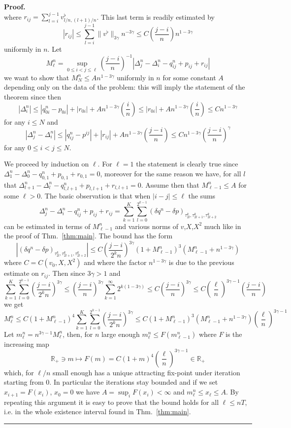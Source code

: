 \documentclass[a4paper,12pt,reqno]{article}
\newcommand{\der}{\delta}
\newcommand{\RR}{\mathbb{R}}
\newenvironment{proof}[1][Proof]{\textbf{#1.} }{\ \rule{0.5em}{0.5em}}
\begin{document}
\begin{proof}
\begin{equation*}
\end{equation*}
where
$
r_{ij}=  \sum_{l=i}^{j-1} v^\flat_{l/n,(l+1)/n}
$.
This last term is readily estimated by
$$
|r_{ij}| \le \sum_{l=i}^{j-1} \|v^\flat\|_{3\gamma} n^{-3\gamma}
 \le C \left(\frac{j-i}{ n}\right) n^{1-3\gamma}
$$
uniformly in $n$.
Let 
$$
M^n_\ell = \sup_{0\le i < j \le \ell} \left(\frac{j-i}{ n}\right)^{-1} |\Delta^n_{j}-\Delta^n_{i} -  q^n_{ij}+p_{ij}+r_{ij}|
$$
we want to show that $M^n_N \le A n^{1-3\gamma}$ uniformly in $n$ for some constant
$A$ depending only on the data of the problem: this will imply the
statement of the theorem since then
$$
|\Delta^n_{i}| \le |q^n_{0i}-p_{0i}| + |r_{0i}| + A n^{1-3\gamma}
\left(\frac{i}{ n}\right)  \le |r_{0i}| + A n^{1-3\gamma}
\left(\frac{i}{ n}\right) \le Cn^{1-3\gamma}
$$
for any $i \le N$ and
$$
|\Delta^n_{j}-\Delta^n_{i}| \le |q^n_{ij}-p^{ij}| + |r_{ij}| + A n^{1-3\gamma}
\left(\frac{j-i}{ n}\right)  \le C n^{1-3\gamma} \left(\frac{j-i}{ n}\right)^\gamma
$$
for any $0\le i<j\le N$.


 We proceed by
induction on $\ell$. For $\ell=1$ the statement is clearly true since
$\Delta^n_{1}-\Delta^n_{0} -  q^n_{0,1}+p_{0,1}+r_{0,1}=0$, moreover
for the same reason we have, for all $l$ that
$\Delta^n_{l+1}-\Delta^n_{l} -  q^n_{l,l+1}+p_{l,l+1}+r_{l,l+1}=0$.
 Assume then
that $M^n_{\ell-1} \le A$ for some $\ell> 0$. The basic observation is that when $|i-j|\le \ell$
the sums
$$
\Delta^n_{j}-\Delta^n_{i} -  q^n_{ij}+p_{ij}+r_{ij} = \sum_{k=1}^K \sum_{l=0}^{2^{k-1}} (\der
q^n- \der p)_{\tau^k_{2l},\tau^k_{2l+1},\tau^k_{2l+2}}
$$
can be estimated in terms of $M^n_{\ell-1}$ and various norms of
$v$,$X$,$X^2$ much like in the proof of Thm.~\ref{thm:main}. The bound
has the form
$$
|(\der
q^n- \der p)_{\tau^k_{2l},\tau^k_{2l+1},\tau^k_{2l+2}}| \le C
\left(\frac{j-i}{2^k n}\right)^{3\gamma} (1+M^n_{\ell-1})^3 (M^n_{\ell-1}+n^{1-3\gamma})
$$
where $C=C(v_0,X,X^2)$ and where the factor $n^{1-3\gamma}$ is due to
the previous estimate on $r_{ij}$. Then since $3\gamma > 1$ and
$$
\sum_{k=1}^K \sum_{l=0}^{2^{k-1}}
\left(\frac{j-i}{2^k n}\right)^{3\gamma}  \le \left(\frac{j-i}{
    n}\right)^{3\gamma} \sum_{k=1}^\infty 2^{k(1-3\gamma)} \le C  \left(\frac{j-i}{
    n}\right)^{3\gamma} \le C \left(\frac{\ell}{
    n}\right)^{3\gamma-1}  \left(\frac{j-i}{
    n}\right) 
$$
we get
$$
M^n_\ell \le C
(1+M^n_{\ell-1})^4 \sum_{k=1}^K \sum_{l=0}^{2^{k-1}}
\left(\frac{j-i}{2^k n}\right)^{3\gamma} \le C (1+M^n_{\ell-1})^3 (M^n_{\ell-1}+n^{1-3\gamma}) \left(\frac{\ell}{
    n}\right)^{3\gamma-1} 
$$
Let $m^n_\ell = n^{3\gamma-1} M^{n}_\ell$, then, for $n$ large enough
$m^n_\ell \le F(m^n_{\ell-1})$ where
$F$ is the increasing map
$$
\RR_+ \ni m \mapsto F(m)= C (1+m)^4 \left(\frac{\ell}{
    n}\right)^{3\gamma-1} \in \RR_+
$$
which, for $\ell/n$ small enough
has a unique attracting fix-point under iteration starting from $0$. 
 In particular the
iterations stay bounded and if we  set $x_{i+1}=F(x_i)$, $x_0=0$ we
have $A = \sup_i F(x_i)  <
\infty$ and $m^n_\ell \le x_\ell \le A$. By repeating this argument it is easy to prove that the
bound holds for all $\ell \le nT$, i.e. in the whole existence
interval found in Thm.~\ref{thm:main}.
\end{proof}
\end{document}
